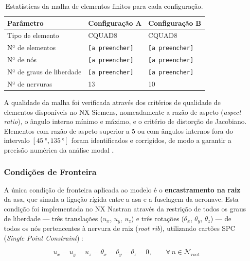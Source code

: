 \documentclass[a4paper,fleqn]{cas-sc}
\begin{document}
\begin{table}
\centering
\caption{Estatísticas da malha de elementos finitos para cada 
configuração.}
\label{tab:malha_stats}
\renewcommand{\arraystretch}{1.4}
\begin{tabularx}{\textwidth}{p{4.5cm} X X}
\toprule
\textbf{Parâmetro} & \textbf{Configuração A} & 
\textbf{Configuração B} \\
\midrule
Tipo de elemento        & CQUAD8    & CQUAD8 \\
Nº de elementos         & \texttt{[a preencher]}  
                        & \texttt{[a preencher]} \\
Nº de nós               & \texttt{[a preencher]}  
                        & \texttt{[a preencher]} \\
Nº de graus de liberdade & \texttt{[a preencher]} 
                        & \texttt{[a preencher]} \\
Nº de nervuras          & 13        & 10 \\
\bottomrule
\end{tabularx}
\end{table}

A qualidade da malha foi verificada através dos critérios de qualidade de elementos disponíveis no NX Siemens, nomeadamente a razão de aspeto (\textit{aspect ratio}), o ângulo interno mínimo e máximo, e o critério de distorção de Jacobiano. Elementos com razão de aspeto superior a 5 ou com ângulos internos fora do intervalo $[\qty{45}{\degree}, \qty{135}{\degree}]$ foram identificados e corrigidos, de modo a garantir a precisão numérica da análise modal \cite{Bathe2014, Cook2001}.

\subsubsection{Condições de Fronteira}

A única condição de fronteira aplicada ao modelo é o \textbf{encastramento na raiz} da asa, que simula a ligação rígida entre a asa e a fuselagem da aeronave. Esta condição foi implementada no NX Nastran através da restrição de todos os graus de liberdade --- três translações ($u_x$, $u_y$, $u_z$) e três rotações ($\theta_x$, $\theta_y$, $\theta_z$) --- de todos os nós pertencentes à nervura de raiz (\textit{root rib}), utilizando cartões SPC (\textit{Single Point Constraint}) \cite{Nastran2014}:

\begin{equation}
    u_x = u_y = u_z = \theta_x = \theta_y = \theta_z = 0, 
    \qquad \forall \, n \in \mathcal{N}_{root}
    \label{eq:spc}
\end{equation}
\end{document}
